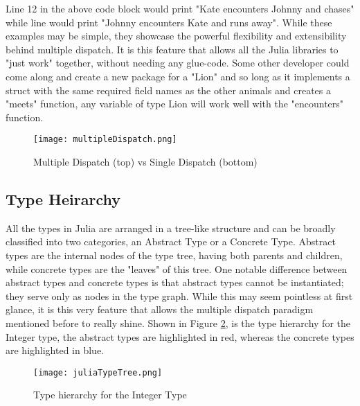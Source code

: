 Line 12 in the above code block would print "Kate encounters Johnny and chases" while line would print "Johnny
encounters Kate and runs away". While these examples may be simple, they showcase the powerful flexibility and
extensibility behind multiple dispatch. It is this feature that allows all the Julia libraries to "just work" together,
without needing any glue-code. Some other developer could come along and create a new package for a "Lion" and so long
as it implements a struct with the same required field names as the other animals and creates a "meets" function, any
variable of type Lion will work well with the "encounters" function. 

\begin{figure}[!h]
    \texttt{[image: multipleDispatch.png]}
    \centering
    \caption{Multiple Dispatch (top) vs Single Dispatch (bottom)} 
    \label{fig:multipleDispatch}
\end{figure}

\subsection{Type Heirarchy}
All the types in Julia are arranged in a tree-like structure and can be broadly classified into two categories, an
Abstract Type or a Concrete Type. Abstract types are the internal nodes of the type tree, having both parents and
children, while concrete types are the "leaves" of this tree. One notable difference between abstract types and concrete
types is that abstract types cannot be instantiated; they serve only as nodes in the type graph. While this may seem
pointless at first glance, it is this very feature that allows the multiple dispatch paradigm mentioned before to really
shine. Shown in Figure \ref{fig:juliaTypeHeirarchy}, is the type hierarchy for the Integer type, the abstract types are
highlighted in red, whereas the concrete types are highlighted in blue. \hfill
\begin{figure}[t]
    \texttt{[image: juliaTypeTree.png]}
    \centering
    \caption{Type hierarchy for the Integer Type} 
    \label{fig:juliaTypeHeirarchy}
\end{figure}

